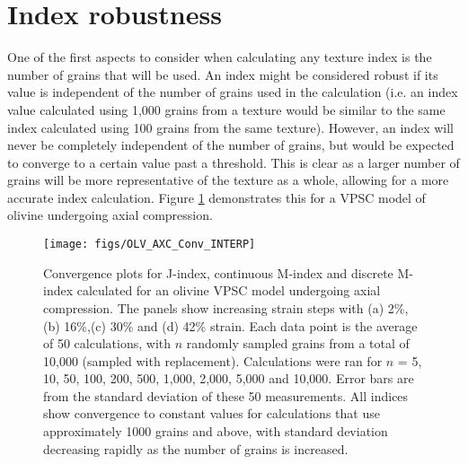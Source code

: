 \documentclass[a4paper,12pt]{report}
\numberwithin{equation}{chapter}
\begin{document}
\section{Index robustness}
One of the first aspects to consider when calculating any texture index is the number of grains that will be used. An index might be considered robust if its value is independent of the number of grains used in the calculation (i.e. an index value calculated using 1,000 grains from a texture would be similar to the same index calculated using 100 grains from the same texture). However, an index will never be completely independent of the number of grains, but would be expected to converge to a certain value past a threshold. This is clear as a larger number of grains will be more representative of the texture as a whole, allowing for a more accurate index calculation. Figure \ref{fig:OLV_AXC_n_conv} demonstrates this for a VPSC model of olivine undergoing axial compression. 

\begin{figure}[h!]
  \centering
    \texttt{[image: figs/OLV\_AXC\_Conv\_INTERP]}
  \caption[Convergence with no. grains (olivine)]{Convergence plots for J-index, continuous M-index and discrete M-index calculated for an olivine VPSC model undergoing axial compression. The panels show increasing strain steps with (a) 2\%, (b) 16\%,(c) 30\% and (d) 42\% strain. Each data point is the average of 50 calculations, with $n$ randomly sampled grains from a total of 10,000 (sampled with replacement). Calculations were ran for $n$ = 5, 10, 50, 100, 200, 500, 1,000, 2,000, 5,000 and 10,000. Error bars are from the standard deviation of these 50 measurements. All indices show convergence to constant values for calculations that use approximately 1000 grains and above, with standard deviation decreasing rapidly as the number of grains is increased.}
  \label{fig:OLV_AXC_n_conv}
\end{figure}
\end{document}
